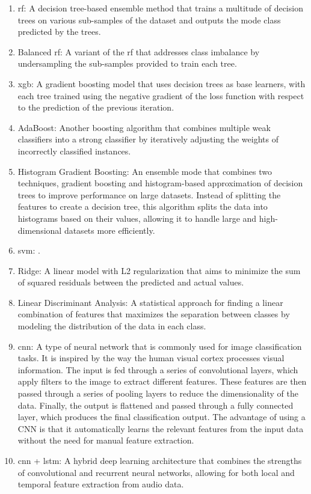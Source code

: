\begin{enumerate}[resume]
	\item \ac{rf}: A decision tree-based ensemble method that trains a multitude of decision trees on various sub-samples of the dataset and outputs the mode class predicted by the trees.
	
	\item Balanced \ac{rf}: A variant of the \ac{rf} that addresses class imbalance by undersampling the sub-samples provided to train each tree.
	
	\item \ac{xgb}: A gradient boosting model that uses decision trees as base learners, with each tree trained using the negative gradient of the loss function with respect to the prediction of the previous iteration.
	
	\item AdaBoost: Another boosting algorithm that combines multiple weak classifiers into a strong classifier by iteratively adjusting the weights of incorrectly classified instances.
	
	\item Histogram Gradient Boosting: An ensemble mode that combines two techniques, gradient boosting and histogram-based approximation of decision trees to improve performance on large datasets. Instead of splitting the features to create a decision tree, this algorithm splits the data into histograms based on their values, allowing it to handle large and high-dimensional datasets more efficiently.
	
	\item \ac{svm}: .
	
	\item Ridge: A linear model with L2 regularization that aims to minimize the sum of squared residuals between the predicted and actual values.
	
	\item Linear Discriminant Analysis: A statistical approach for finding a linear combination of features that maximizes the separation between classes by modeling the distribution of the data in each class.
	
	\item \ac{cnn}: A type of neural network that is commonly used for image classification tasks. It is inspired by the way the human visual cortex processes visual information. The input is fed through a series of convolutional layers, which apply filters to the image to extract different features. These features are then passed through a series of pooling layers to reduce the dimensionality of the data. Finally, the output is flattened and passed through a fully connected layer, which produces the final classification output. The advantage of using a CNN is that it automatically learns the relevant features from the input data without the need for manual feature extraction.
	
	\item \ac{cnn} + \ac{lstm}: A hybrid deep learning architecture that combines the strengths of convolutional and recurrent neural networks, allowing for both local and temporal feature extraction from audio data.
	
\end{enumerate}
